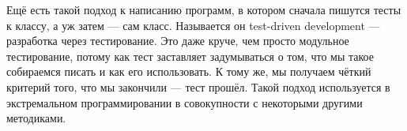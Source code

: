\documentclass[a5paper]{article}
\begin{document}
Ещё есть такой подход к написанию программ, в котором сначала пишутся тесты к классу, а уж затем --- сам класс. Называется он test-driven development --- разработка через тестирование. Это даже круче, чем просто модульное тестирование, потому как тест заставляет задумываться о том, что мы такое собираемся писать и как его использовать. К тому же, мы получаем чёткий критерий того, что мы закончили --- тест прошёл. Такой подход используется в экстремальном программировании в совокупности с некоторыми другими методиками.
\end{document}
